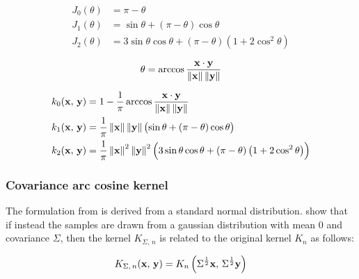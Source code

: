 \begin{align}
	J_0(\theta) & = \pi - \theta                                                                    \\
	J_1(\theta) & = \sin\theta + \left(\pi - \theta\right)\cos\theta                                \\
	J_2(\theta) & = 3\sin\theta\cos\theta + \left(\pi - \theta\right)\left(1 + 2\cos^2\theta\right)
\end{align}

\begin{equation}
	\theta = \arccos\frac{\mathbf{x} \cdot \mathbf{y}}{\left\lVert \mathbf{x} \right\rVert \left\lVert \mathbf{y} \right\rVert}
\end{equation}


\begin{align}
	k_0(\mathbf{x},\,\mathbf{y}) & = 1 - \frac{1}{\pi} \arccos\frac{\mathbf{x} \cdot \mathbf{y}}{\left\lVert \mathbf{x} \right\rVert \left\lVert \mathbf{y} \right\rVert} \\
	k_1(\mathbf{x},\,\mathbf{y}) & = \frac{1}{\pi} \left\lVert \mathbf{x} \right\rVert \left\lVert \mathbf{y} \right\rVert
	\bigl( \sin\theta + \left(\pi - \theta\right)\cos\theta \bigr)                                                        \\
	k_2(\mathbf{x},\,\mathbf{y}) & = \frac{1}{\pi} \left\lVert \mathbf{x} \right\rVert^2 \left\lVert \mathbf{y} \right\rVert^2
	\Bigl( 3\sin\theta\cos\theta + \left(\pi - \theta\right)\left(1 + 2\cos^2\theta\right) \Bigr)
\end{align}

\subsubsection{Covariance arc cosine kernel}

The formulation from \textcite{choLargemarginClassificationInfinite2010} is derived from a standard normal
distribution. \Textcite{pandeyGoDeepWide2014} show that if instead the samples are drawn from a gaussian
distribution with mean 0 and covariance $\Sigma$, then the kernel $K_{\Sigma,\,n}$ is related to the
original kernel $K_{n}$ as follows:

\begin{equation}\label{eq:kernel_pandey}
K_{\Sigma,\,n}(\mathbf{x},\,\mathbf{y}) = K_{n}\left(\Sigma^{\frac{1}{2}}\mathbf{x},\,\Sigma^{\frac{1}{2}}\mathbf{y}\right)
\end{equation}
